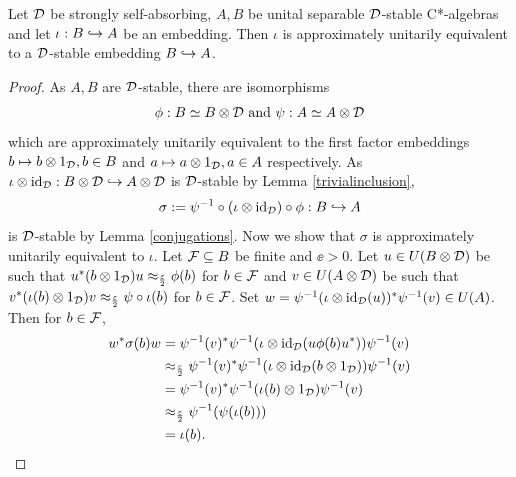\documentclass[12pt]{amsart}
\begin{document}
    \begin{prop}\label{allembeddingsareue}
        Let $\mathcal{D}$ be strongly self-absorbing, $A,B$ be unital separable $\mathcal{D}$-stable C*-algebras and let $\iota: B \hookrightarrow A$ be an embedding. Then $\iota$ is approximately unitarily equivalent to a $\mathcal{D}$-stable embedding $B \hookrightarrow A$.
          \begin{proof}
            As $A,B$ are $\mathcal{D}$-stable, there are isomorphisms
\begin{equation}
             \phi: B \simeq B \otimes \mathcal{D} \text{ and }\psi: A \simeq A \otimes \mathcal{D}
\end{equation}
            which are approximately unitarily equivalent to the first factor embeddings $b \mapsto b \otimes 1_{\mathcal{D}}, b \in B$ and $a \mapsto a \otimes 1_{\mathcal{D}}, a \in A$ respectively. As $\iota \otimes \text{id}_{\mathcal{D}}: B \otimes \mathcal{D} \hookrightarrow A \otimes \mathcal{D}$ is $\mathcal{D}$-stable by Lemma \ref{trivialinclusion},
\begin{equation}
            \sigma := \psi^{-1} \circ (\iota \otimes \text{id}_{\mathcal{D}}) \circ \phi: B \hookrightarrow A
\end{equation}
            is $\mathcal{D}$-stable by Lemma \ref{conjugations}. Now we show that $\sigma$ is approximately unitarily equivalent to $\iota$. Let $\mathcal{F} \subseteq B$ be finite and $\ee > 0$. Let $u \in U(B \otimes \mathcal{D})$ be such that $u^*(b \otimes 1_{\mathcal{D}})u \approx_\frac{\varepsilon}{2} \phi(b)$ for $b \in \mathcal{F}$ and $v \in U(A \otimes \mathcal{D})$ be such that $v^*(\iota(b) \otimes 1_{\mathcal{D}})v \approx_{\frac{\varepsilon}{2}} \psi \circ \iota (b)$ for $b \in \mathcal{F}$. Set $w = \psi^{-1}(\iota \otimes \text{id}_{\mathcal{D}}(u))^*\psi^{-1}(v) \in U(A)$. Then for $b \in \mathcal{F}$,
\begin{equation}
\begin{split}
                w^*\sigma(b)w &= \psi^{-1}(v)^*\psi^{-1}(\iota \otimes \text{id}_{\mathcal{D}}(u\phi(b)u^*))\psi^{-1}(v) \\
                              &\approx_{\frac{\varepsilon}{2}} \psi^{-1}(v)^*\psi^{-1}(\iota \otimes \text{id}_{\mathcal{D}}(b \otimes 1_{\mathcal{D}}))\psi^{-1}(v) \\
                              &= \psi^{-1}(v)^*\psi^{-1}(\iota(b) \otimes 1_{\mathcal{D}})\psi^{-1}(v) \\
                              &\approx_{\frac{\varepsilon}{2}} \psi^{-1}(\psi(\iota(b))) \\
                              &= \iota(b).
\end{split}
\end{equation}

          \end{proof}
      \end{prop}
\end{document}
